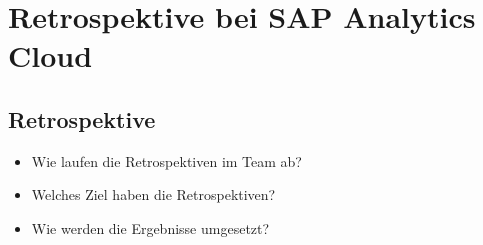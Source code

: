 \section{Retrospektive bei SAP Analytics Cloud}\label{sec:kaptiel}

\subsection{Retrospektive}
\begin{itemize}
    \item Wie laufen die Retrospektiven im Team ab?
    \item Welches Ziel haben die Retrospektiven?
    \item Wie werden die Ergebnisse umgesetzt? 
\end{itemize}

